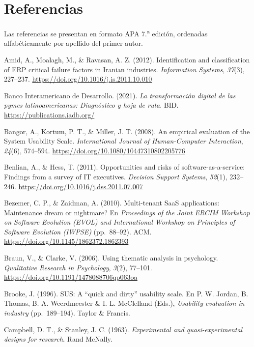 \chapter{Referencias}

Las referencias se presentan en formato APA 7.\textsuperscript{a} edición, ordenadas alfabéticamente por apellido del primer autor.

\vspace{1em}
\begingroup
\setlength{\parindent}{-1.5em}
\setlength{\leftskip}{1.5em}
\setlength{\parskip}{0.6em}

Amid, A., Moalagh, M., \& Ravasan, A. Z. (2012). Identification and classification of ERP critical
failure factors in Iranian industries. \emph{Information Systems}, \emph{37}(3), 227--237.
\url{https://doi.org/10.1016/j.is.2011.10.010}

Banco Interamericano de Desarrollo. (2021). \emph{La transformación digital de las pymes latinoamericanas:
Diagnóstico y hoja de ruta}. BID. \url{https://publications.iadb.org/}

Bangor, A., Kortum, P. T., \& Miller, J. T. (2008). An empirical evaluation of the System Usability
Scale. \emph{International Journal of Human-Computer Interaction}, \emph{24}(6), 574--594.
\url{https://doi.org/10.1080/10447310802205776}

Benlian, A., \& Hess, T. (2011). Opportunities and risks of software-as-a-service: Findings from a
survey of IT executives. \emph{Decision Support Systems}, \emph{52}(1), 232--246.
\url{https://doi.org/10.1016/j.dss.2011.07.007}

Bezemer, C. P., \& Zaidman, A. (2010). Multi-tenant SaaS applications: Maintenance dream or
nightmare? En \emph{Proceedings of the Joint ERCIM Workshop on Software Evolution (EVOL) and
International Workshop on Principles of Software Evolution (IWPSE)} (pp.~88--92). ACM.
\url{https://doi.org/10.1145/1862372.1862393}

Braun, V., \& Clarke, V. (2006). Using thematic analysis in psychology. \emph{Qualitative Research in
Psychology}, \emph{3}(2), 77--101. \url{https://doi.org/10.1191/1478088706qp063oa}

Brooke, J. (1996). SUS: A ``quick and dirty'' usability scale. En P. W. Jordan, B. Thomas,
B. A. Weerdmeester \& I. L. McClelland (Eds.), \emph{Usability evaluation in industry} (pp.~189--194).
Taylor \& Francis.

Campbell, D. T., \& Stanley, J. C. (1963). \emph{Experimental and quasi-experimental designs for
research}. Rand McNally.

